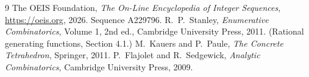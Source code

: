 \documentclass[11pt,a4paper]{article}
\theoremstyle{plain}
\theoremstyle{definition}
\begin{document}
\begin{thebibliography}{9}
 The OEIS Foundation, \emph{The On-Line Encyclopedia of Integer
Sequences}, \url{https://oeis.org}, 2026. Sequence A229796.
 R.~P.~Stanley, \emph{Enumerative Combinatorics}, Volume 1, 2nd ed.,
Cambridge University Press, 2011. (Rational generating functions, Section 4.1.)
 M.~Kauers and P.~Paule, \emph{The Concrete Tetrahedron}, Springer, 2011.
 P.~Flajolet and R.~Sedgewick, \emph{Analytic Combinatorics}, Cambridge
University Press, 2009.
\end{thebibliography}
\end{document}
